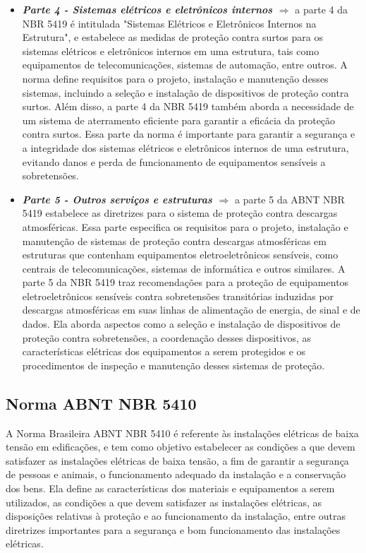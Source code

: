 \documentclass[a4paper, 12pt, onecolumn,singlespacing]{article}
\begin{document}
\begin{itemize}
			\item \textbf{\textit{Parte 4 - Sistemas elétricos e eletrônicos internos $\Rightarrow$ }}a parte 4 da NBR 5419 é intitulada "Sistemas Elétricos e Eletrônicos Internos na Estrutura", e estabelece as medidas de proteção contra surtos para os sistemas elétricos e eletrônicos internos em uma estrutura, tais como equipamentos de telecomunicações, sistemas de automação, entre outros. A norma define requisitos para o projeto, instalação e manutenção desses sistemas, incluindo a seleção e instalação de dispositivos de proteção contra surtos. Além disso, a parte 4 da NBR 5419 também aborda a necessidade de um sistema de aterramento eficiente para garantir a eficácia da proteção contra surtos. Essa parte da norma é importante para garantir a segurança e a integridade dos sistemas elétricos e eletrônicos internos de uma estrutura, evitando danos e perda de funcionamento de equipamentos sensíveis a sobretensões.
			\item \textbf{\textit{Parte 5 - Outros serviços e estruturas $\Rightarrow$ }}a parte 5 da ABNT NBR 5419 estabelece as diretrizes para o sistema de proteção contra descargas atmosféricas. Essa parte especifica os requisitos para o projeto, instalação e manutenção de sistemas de proteção contra descargas atmosféricas em estruturas que contenham equipamentos eletroeletrônicos sensíveis, como centrais de telecomunicações, sistemas de informática e outros similares.	A parte 5 da NBR 5419 traz recomendações para a proteção de equipamentos eletroeletrônicos sensíveis contra sobretensões transitórias induzidas por descargas atmosféricas em suas linhas de alimentação de energia, de sinal e de dados. Ela aborda aspectos como a seleção e instalação de dispositivos de proteção contra sobretensões, a coordenação desses dispositivos, as características elétricas dos equipamentos a serem protegidos e os procedimentos de inspeção e manutenção desses sistemas de proteção.
		\end{itemize}
		
		\subsection{Norma ABNT NBR 5410}
		
		A Norma Brasileira ABNT NBR 5410 é referente às instalações elétricas de baixa tensão em edificações, e tem como objetivo estabelecer as condições a que devem satisfazer as instalações elétricas de baixa tensão, a fim de garantir a segurança de pessoas e animais, o funcionamento adequado da instalação e a conservação dos bens. Ela define as características dos materiais e equipamentos a serem utilizados, as condições a que devem satisfazer as instalações elétricas, as disposições relativas à proteção e ao funcionamento da instalação, entre outras diretrizes importantes para a segurança e bom funcionamento das instalações elétricas.
		
\end{document}
